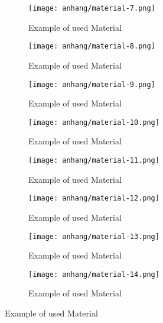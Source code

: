	
	
	\begin{figure}[h]
		\centering
		\begin{subfigure}{0.45\textwidth}
			\centering
			\texttt{[image: anhang/material-7.png]}
			\caption[Example of used Material, created by \cite{Quixel}]{Example of used Material}
		\end{subfigure}
		\begin{subfigure}{0.45\textwidth}
			\centering
			\texttt{[image: anhang/material-8.png]}
			\caption[Example of used Material, created by \cite{Quixel}]{Example of used Material}
		\end{subfigure}
		
		\begin{subfigure}{0.45\textwidth}
			\centering
			\texttt{[image: anhang/material-9.png]}
			\caption[Example of used Material, created by \cite{Quixel}]{Example of used Material}
		\end{subfigure}
		\begin{subfigure}{0.45\textwidth}
			\centering
			\texttt{[image: anhang/material-10.png]}
			\caption[Example of used Material, created by \cite{Quixel}]{Example of used Material}
		\end{subfigure}
		
		\begin{subfigure}{0.45\textwidth}
			\centering
			\texttt{[image: anhang/material-11.png]}
			\caption[Example of used Material, created by \cite{Quixel}]{Example of used Material}
		\end{subfigure}
		\begin{subfigure}{0.45\textwidth}
			\centering
			\texttt{[image: anhang/material-12.png]}
			\caption[Example of used Material, created by \cite{Quixel}]{Example of used Material}
		\end{subfigure}
		
		\begin{subfigure}{0.45\textwidth}
			\centering
			\texttt{[image: anhang/material-13.png]}
			\caption[Example of used Material, created by \cite{Quixel}]{Example of used Material}
		\end{subfigure}
		\begin{subfigure}{0.45\textwidth}
			\centering
			\texttt{[image: anhang/material-14.png]}
			\caption[Example of used Material, created by \cite{Quixel}]{Example of used Material}
		\end{subfigure}
	\end{figure}
	
